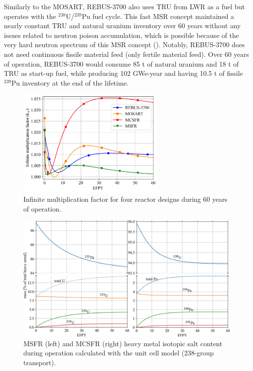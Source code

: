 \documentclass[letterpaper]{mandc2019}
\begin{document}
Similarly to the \gls{MOSART}, REBUS-3700 also uses TRU from \gls{LWR} as a fuel but operates with the $^{238}$U/$^{239}$Pu fuel cycle. 
This fast \gls{MSR} concept maintained a nearly constant TRU and natural uranium inventory over 60 years without any issues related to neutron poison accumulation, which is possible because of the very hard neutron spectrum of this \gls{MSR} concept (). 
Notably, REBUS-3700 does not need continuous fissile material feed (only fertile material feed). 
Over 60 years of operation, REBUS-3700 would consume 85 t of natural uranium and 18 t of TRU as start-up fuel, while producing 102 GWe-year and having 10.5 t of fissile $^{239}$Pu inventory at the end of the lifetime. 
\begin{figure}[t!]
  \centering
  \vspace{-0.3in}
  \includegraphics[width=0.65\textwidth]{./Figures/k_inf.png}
	  \vspace{-0.15in}
  \caption{Infinite multiplication factor for four reactor designs during 60 years of operation.}
  \label{fig:k_inf}
\end{figure}
\begin{figure}[t!]
  \centering
  \includegraphics[width=\textwidth]{./Figures/msfr_mcsfr_balance.png}
	  \vspace{-0.2in}
  \caption{\gls{MSFR} (left) and \gls{MCSFR} (right) heavy metal isotopic salt content during operation calculated with the unit cell model (238-group transport).}
  \label{fig:msfr-u-balance}
\end{figure}
\end{document}

